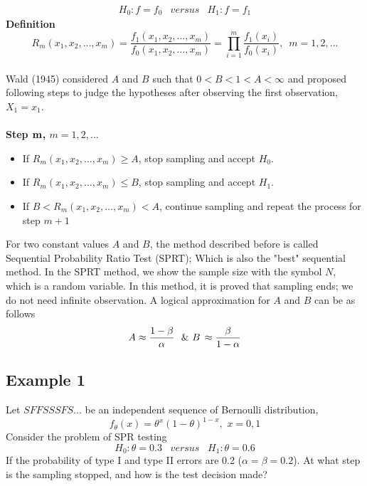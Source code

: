 \documentclass{article}
\begin{document}
\begin{eqnarray*}
H_0:f=f_0  &versus&  H_1:f=f_1
\end{eqnarray*}
{\bf Definition}
\[{R_m}({x_1},{x_2}, \ldots ,{x_m}) = \frac{{{f_1}({x_1},{x_2}, \ldots ,{x_m})}}{{{f_0}({x_1},{x_2}, \ldots ,{x_m})}} = \prod\limits_{i = 1}^m {\frac{{{f_1}({x_i})}}{{{f_0}({x_i})}}} ,\,\,\,m = 1,2,...\]
\\
Wald (1945) considered $A$ and $B$ such that $0 < B < 1 < A < \infty$ and proposed following steps to judge the hypotheses after observing the first observation, $X_1=x_1$.\\\\
{\bf Step ${\bf m}$, $m = 1,2,...$}\\
\begin{itemize}
\item
If ${R_m}({x_1},{x_2}, \ldots ,{x_m}) \ge A$, stop sampling and accept $H_0$.\\
\item
If ${R_m}({x_1},{x_2}, \ldots ,{x_m}) \le B$, stop sampling and accept $H_1$.\\
\item
If $B<{R_m}({x_1},{x_2}, \ldots ,{x_m}) < A$, continue sampling  and repeat the process for step $m+1$\\
\end{itemize}
For two constant values $A$ and $B$, the method described before is called Sequential Probability Ratio Test (SPRT); Which is also the "best" sequential method.
In the SPRT method, we show the sample size with the symbol $N$, which is a random variable. In this method, it is proved that sampling ends; we do not need infinite observation. A logical approximation for $A$ and $B$ can be as follows
\[A \approx \frac{{1 - \beta }}{\alpha }\,\,\,\,{\rm{\& }}\,\,B\, \approx \frac{\beta }{{1 - \alpha }}\]
\subsection{Example 1}
Let $S F F S S S F S...$ be an independent sequence of Bernoulli distribution,
\[{f_\theta }(x) = {\theta ^x}{(1 - \theta )^{1 - x}},\,\,x = 0,1\] Consider the problem of SPR testing
\[{H_0}:\theta  = 0.3\,\,\,\,\,versus\,\,\,\,\,{H_1}:\theta  = 0.6\]
If the probability of type I and type II errors are 0.2 ($\alpha=\beta=0.2$). At what step is the sampling stopped, and how is the test decision made?
\end{document}
